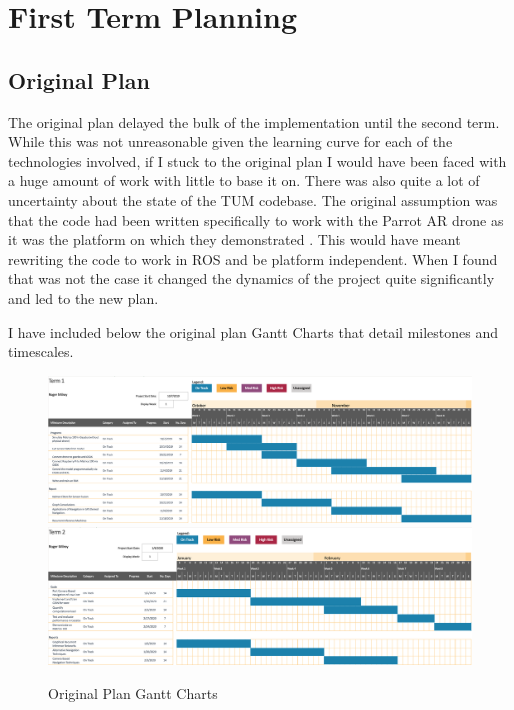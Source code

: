 \documentclass[]{../resources/final_report}
\begin{document}
\chapter{First Term Planning}

\section{Original Plan}

The original plan delayed the bulk of the implementation until the second term. While this was 
not unreasonable given the learning curve for each of the technologies involved, if I stuck to 
the original plan I would have been faced with a huge amount of work with little to base it on.
There was also quite a lot of uncertainty about the state of the TUM codebase. The original 
assumption was that the code had been written specifically to work with the Parrot AR drone as 
it was the platform on which they demonstrated \cite{Engel:Camera-basedNav}.
This would have meant rewriting the code to work in ROS and be platform independent. When I found 
that was not the case it changed the dynamics of the project quite significantly and led to the 
new plan.

I have included below the original plan Gantt Charts that detail milestones and timescales.
\\
\begin{figure}[h]
  \centering
  \includegraphics[width=\textwidth]{Term1Ganttv1.png}
  \includegraphics[width=\textwidth]{Term2Ganttv1.png}
  \caption{Original Plan Gantt Charts}
  \label{}
\end{figure}
\end{document}
